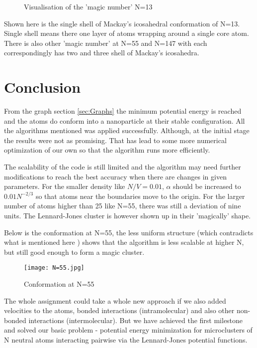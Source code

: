\documentclass{scrartcl}
\begin{document}
\begin{figure}[h!]
    \centering
    \caption{Visualisation of the 'magic number' N=13}
    \label{fig:my_label7}
\end{figure}
Shown here is the single shell of Mackay's icosahedral conformation of N=13. Single shell means there one layer of atoms wrapping around a single core atom. There is also other 'magic number' at N=55 and N=147 with each correspondingly has two and three shell of Mackay's icosahedra.


\newpage
\section{Conclusion}
\par From the graph section \ref{sec:Graphs} the minimum potential energy is reached and the atoms do conform into a nanoparticle at their stable configuration. All the algorithms mentioned was applied successfully. Although, at the initial stage the results were not as promising. That has lead to some more numerical optimization of our own so that the algorithm runs more efficiently. 
\par The scalability of the code is still limited and the algorithm may need further modifications to reach the best accuracy when there are changes in given parameters. For the smaller density like $N/V=0.01$, $\alpha$ should be increased to $0.01N^{-2/3}$ so that atoms near the boundaries move to the origin. For the larger number of atoms higher than 25 like N=55, there was still a deviation of nine units. The Lennard-Jones cluster is however shown up in their 'magically' shape.

\par Below is the conformation at N=55, the less uniform structure (which contradicts what is mentioned here \cite{GOLJC}) shows that the algorithm is less scalable at higher N, but still good enough to form a magic cluster.

\begin{figure}[h!]
        \centering
        \texttt{[image: N=55.jpg]}
        \caption{Conformation at N=55}
        \label{fig:my_label 6}
\end{figure}

The whole assignment could take a whole new approach if we also added velocities to the atoms, bonded interactions (intramolecular) and also other non-bonded interactions (intermolecular). But we have achieved the first milestone and solved our basic problem - potential energy minimization for  microclusters of N neutral atoms interacting pairwise via the 
Lennard-Jones potential functions.

\newpage
\singlespacing




\end{document}
